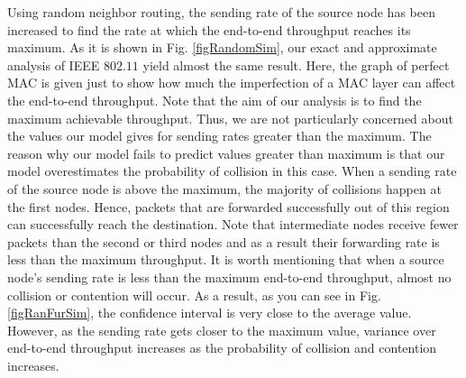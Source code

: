 \documentclass[12pt, draftclsnofoot, onecolumn]{IEEEtran}
\begin{document}

Using random neighbor routing, the sending rate of the source node
has been increased to find the rate at which the end-to-end throughput 
reaches its maximum. 
As it is shown in Fig. \ref{figRandomSim}, our 
exact and approximate analysis of IEEE $802.11$ yield almost the same result.
Here, the graph of perfect MAC is 
given just to show how much the imperfection of a MAC layer can affect 
the end-to-end throughput.
Note that the aim of our analysis is to find the maximum achievable 
throughput. Thus, we are not particularly concerned about the values 
our model gives for sending rates greater than the maximum. The reason 
why our model fails to predict values greater than maximum is that our 
model overestimates the probability of collision in this case. When a sending
rate of the source node is above the maximum, the majority of collisions happen 
at the first nodes. Hence, packets that are forwarded successfully out of this 
region can successfully reach the destination. Note that intermediate nodes 
receive fewer packets than the second or third nodes and as a result their 
forwarding rate is less than the maximum throughput. It is worth mentioning that when a source node's sending rate is
less than the maximum end-to-end throughput, almost no collision or contention will occur. As a result, as you can see in Fig. \ref{figRanFurSim}, 
the confidence interval is very close to the average value. However, as the sending rate gets closer to the maximum value, variance over end-to-end throughput increases as the probability of collision and contention increases. 

%


\begin{figure*}[t!]
\begin{center}
\caption{End-to-end throughput in $1$-D networks}
\label{figRanFurSim}
\end{center}
\end{figure*}
\end{document}
